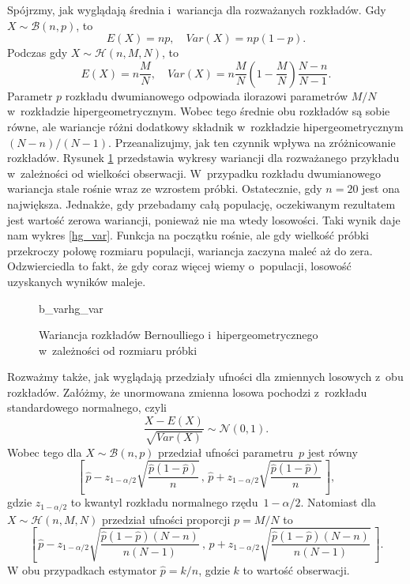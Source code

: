 Spójrzmy, jak wyglądają średnia i~wariancja dla rozważanych rozkładów.
Gdy $X\sim\mathcal{B}(n,p)$, to
\begin{equation}
E(X)=np,\quad Var(X)=np(1-p).
\end{equation}
Podczas gdy $X\sim\mathcal{H}(n,M,N)$, to
\begin{equation}
E(X)=n\frac{M}{N},\quad Var(X)=n\frac{M}{N}\left(1-\frac{M}{N}\right)\frac{N-n}{N-1}.
\end{equation}
Parametr $p$ rozkładu dwumianowego odpowiada ilorazowi parametrów $M/N$ w~rozkładzie hipergeometrycznym. Wobec tego średnie obu rozkładów są sobie równe, ale wariancje różni dodatkowy składnik w~rozkładzie hipergeometrycznym $(N-n)/(N-1)$. Przeanalizujmy, jak ten czynnik wpływa na zróżnicowanie rozkładów. Rysunek \ref{var} przedstawia wykresy wariancji dla rozważanego przykładu w~zależności od wielkości obserwacji. W~przypadku rozkładu dwumianowego wariancja stale rośnie wraz ze wzrostem próbki. Ostatecznie, gdy $n=20$ jest ona największa. Jednakże, gdy przebadamy całą populację, oczekiwanym rezultatem jest wartość zerowa wariancji, ponieważ nie ma wtedy losowości. Taki wynik daje nam wykres \ref{hg_var}. Funkcja na początku rośnie, ale gdy wielkość próbki przekroczy połowę rozmiaru populacji, wariancja zaczyna maleć aż do zera. Odzwierciedla to fakt, że gdy coraz więcej wiemy o~populacji, losowość uzyskanych wyników maleje.


\begin{figure}[h]
	\begin{subdiagrams}{b_var}{hg_var}
	\end{subdiagrams}

	\caption{Wariancja rozkładów Bernoulliego i~hipergeometrycznego w~zależności od rozmiaru próbki}
	\label{var}
\end{figure}

Rozważmy także, jak wyglądają przedziały ufności dla zmiennych losowych z~obu rozkładów. Załóżmy, że unormowana zmienna losowa pochodzi z~rozkładu standardowego normalnego, czyli
\begin{equation}
\frac{X-E(X)}{\sqrt{Var(X)}}\sim \mathcal{N}(0,1).
\end{equation}
Wobec tego dla $X\sim \mathcal{B}(n,p)$ przedział ufności parametru~$p$ jest równy
\begin{equation}
\left[\, \hat{p}-z_{1-\alpha/2}\sqrt{\frac{\hat{p}(1-\hat{p})}{n}}\, , \,  \hat{p}+z_{1-\alpha/2}\sqrt{\frac{\hat{p}(1-\hat{p})}{n}}\, \right],
\end{equation}
gdzie $z_{1-\alpha/2}$ to kwantyl rozkładu normalnego rzędu~$1-\alpha/2$.
Natomiast dla $X\sim\mathcal{H}(n,M,N)$ przedział ufności proporcji $p=M/N$ to
\begin{equation}
\left[\, \hat{p}-z_{1-\alpha/2} \sqrt{\frac{\hat{p}(1-\hat{p})(N-n)}{n(N-1)}}\, , \, \hat{p} + z_{1-\alpha/2} \sqrt{\frac{\hat{p}(1-\hat{p})(N-n)}{n(N-1)}}\, \right].
\end{equation}
W obu przypadkach estymator $\hat{p}=k/n$, gdzie $k$ to wartość obserwacji.

